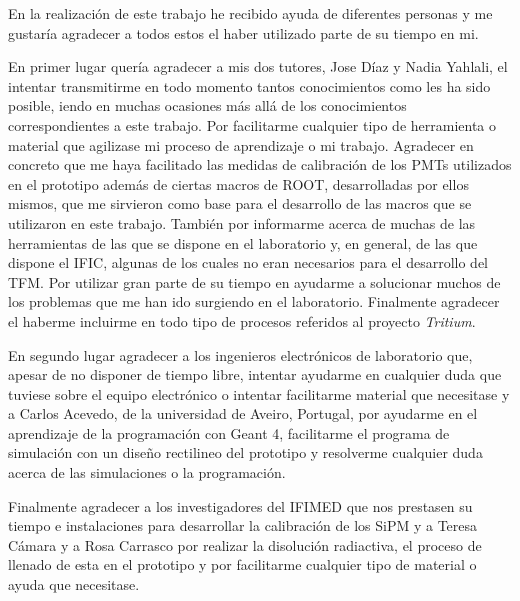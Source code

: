 En la realización de este trabajo he recibido ayuda de diferentes personas y me gustaría agradecer a todos estos el haber utilizado parte de su tiempo en mi.

En primer lugar quería agradecer a mis dos tutores, Jose Díaz y Nadia Yahlali, el intentar transmitirme en todo momento tantos conocimientos como les ha sido posible, iendo en muchas ocasiones más allá de los conocimientos correspondientes a este trabajo. Por facilitarme cualquier tipo de herramienta o material que agilizase mi proceso de aprendizaje o mi trabajo. Agradecer en concreto que me haya facilitado las medidas de calibración de los PMTs utilizados en el prototipo además de ciertas macros de ROOT, desarrolladas por ellos mismos, que me sirvieron como base para el desarrollo de las macros que se utilizaron en este trabajo. También por informarme acerca de muchas de las herramientas de las que se dispone en el laboratorio y, en general, de las que dispone el IFIC, algunas de los cuales no eran necesarios para el desarrollo del TFM. Por utilizar gran parte de su tiempo en ayudarme a solucionar muchos de los problemas que me han ido surgiendo en el laboratorio. Finalmente agradecer el haberme incluirme en todo tipo de procesos referidos al proyecto \textit{Tritium}. 

En segundo lugar agradecer a los ingenieros electrónicos de laboratorio que, apesar de no disponer de tiempo libre, intentar ayudarme en cualquier duda que tuviese sobre el equipo electrónico o intentar facilitarme material que necesitase y a Carlos Acevedo, de la universidad de Aveiro, Portugal, por ayudarme en el aprendizaje de la programación con Geant 4, facilitarme el programa de simulación con un diseño rectilineo del prototipo y resolverme cualquier duda acerca de las simulaciones o la programación.

Finalmente agradecer a los investigadores del IFIMED que nos prestasen su tiempo e instalaciones para desarrollar la calibración de los SiPM  y a Teresa Cámara y a Rosa Carrasco por realizar la disolución radiactiva, el proceso de llenado de esta en el prototipo y por facilitarme cualquier tipo de material o ayuda que necesitase.